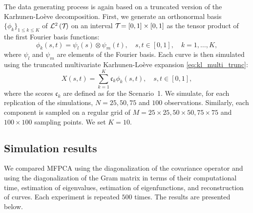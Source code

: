 \begin{scenario}
The data generating process is again based on a truncated version of the Karhunen-Loève decomposition. First, we generate an orthonormal basis $\{\phi_k\}_{1 \leq k \leq K}$ of $\mathcal{L}^{2}\left(\mathcal{T}_{}\right)$ on an interval $\mathcal{T}_{} = [0, 1] \times [0, 1]$ as the tensor product of the first Fourier basis functions:
\begin{equation}
    \phi_k(s, t) = \psi_l(s) \otimes \psi_m(t), \quad s, t \in [0, 1],\quad k = 1, \dots, K,
\end{equation}
where $\psi_l$ and $\psi_m$ are elements of the Fourier basis.
Each curve is then simulated using the truncated multivariate Karhunen-Loève expansion \eqref{eq:kl_multi_trunc}:
\begin{equation}
    X(s, t) = \sum_{k = 1}^K \mathfrak{c}_k \phi_k(s, t), \quad s, t \in [0, 1],
\end{equation}
where the scores $\mathfrak{c}_k$ are defined as for the Scenario~1. We simulate, for each replication of the simulations, $N = 25, 50, 75$ and $100$ observations. Similarly, each component is sampled on a regular grid of $M = 25 \times 25, 50 \times 50, 75 \times 75$ and $100 \times 100$ sampling points. We set $K = 10$.
\end{scenario}


\subsection{Simulation results} %
\label{sub:simulation_results}

We compared MFPCA using the diagonalization of the covariance operator and using the diagonalization of the Gram matrix in terms of their computational time, estimation of eigenvalues, estimation of eigenfunctions, and reconstruction of curves.  Each experiment is repeated $500$ times. The results are presented below.

